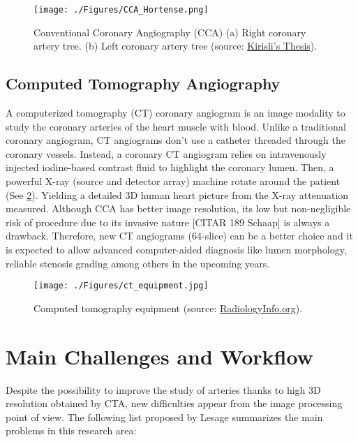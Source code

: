 \begin{figure}[htbp]
	\centering
		\texttt{[image: ./Figures/CCA\_Hortense.png]}
	\caption[Conventional Coronary Angiography]{Conventional Coronary Angiography (CCA) (a) Right coronary artery tree. (b) Left coronary artery tree  (source: \href{http://www.bigr.nl/publication/880}{Kirisli's Thesis}).}
	\label{fig:cca_im}
\end{figure}

\subsection{Computed Tomography Angiography }

A computerized tomography (CT) coronary angiogram is an image modality to study the coronary arteries of the heart muscle with blood. Unlike a traditional coronary angiogram, CT angiograms don't use a catheter threaded through the coronary vessels. Instead, a coronary CT angiogram relies on intravenously injected iodine-based contrast fluid to highlight the coronary lumen. Then, a powerful X-ray (source and detector array) machine rotate around the patient 
(See \ref{fig:ct_eq}). Yielding a detailed 3D human heart picture from the X-ray attenuation measured. Although CCA has better image resolution, its low but non-negligible risk of procedure due to its invasive nature [CITAR 189 Schaap] is always a drawback. Therefore, new CT angiograms (64-slice) can be a better choice and it is expected to allow advanced computer-aided diagnosis like lumen morphology, reliable stenosis grading among others in the upcoming years.

\begin{figure}[htbp]
	\centering
		\texttt{[image: ./Figures/ct\_equipment.jpg]}
	\caption[Computed tomography equipment]{Computed tomography equipment (source: \href{http://www.radiologyinfo.org/}{RadiologyInfo.org}).}
	\label{fig:ct_eq}
\end{figure}

\section{Main Challenges and Workflow}
%
Despite the possibility to improve the study of arteries thanks to high 3D resolution obtained by CTA, new difficulties appear from the image processing point of view. The following list proposed by Lesage \citep{Lesage2009Thesis} summarizes the main problems in this research area:

